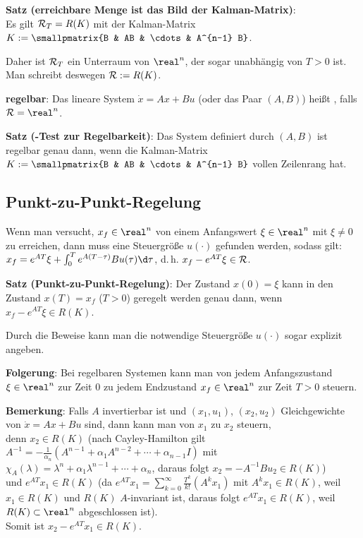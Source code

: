 \linie

\textbf{Satz (erreichbare Menge ist das Bild der Kalman-Matrix)}:\\
Es gilt $\mathcal{R}_T = R(K)$ mit der Kalman-Matrix
$K := \smallpmatrix{B & AB & \cdots & A^{n-1} B}$.

Daher ist $\mathcal{R}_T$ ein Unterraum von $\real^n$, der sogar unabhängig von $T > 0$ ist.
Man schreibt deswegen $\mathcal{R} := R(K)$.

\textbf{regelbar}:
Das lineare System $\dot{x} = Ax + Bu$ (oder das Paar $(A, B)$) heißt
, falls $\R = \real^n$.

\textbf{Satz (-Test zur Regelbarkeit)}:
Das System definiert durch $(A, B)$ ist regelbar genau dann,
wenn die Kalman-Matrix $K := \smallpmatrix{B & AB & \cdots & A^{n-1} B}$ vollen Zeilenrang hat.

\subsection{%
    Punkt-zu-Punkt-Regelung%
}

Wenn man versucht, $x_f \in \real^n$ von einem Anfangswert $\xi \in \real^n$ mit $\xi \not= 0$
zu erreichen, dann muss eine Steuergröße $u(\cdot)$ gefunden werden,
sodass gilt:
$x_f = e^{AT}\xi + \int_0^T e^{A(T-\tau)} Bu(\tau) \d\tau$,
d.\,h. $x_f - e^{AT}\xi \in \mathcal{R}$.

\textbf{Satz (Punkt-zu-Punkt-Regelung)}:
Der Zustand $x(0) = \xi$ kann in den Zustand $x(T) = x_f$ ($T > 0$) geregelt werden genau dann,
wenn $x_f - e^{AT} \xi \in R(K)$.

Durch die Beweise kann man die notwendige Steuergröße $u(\cdot)$ sogar explizit angeben.

\textbf{Folgerung}:
Bei regelbaren Systemen kann man von jedem Anfangszustand $\xi \in \real^n$
zur Zeit $0$ zu jedem Endzustand $x_f \in \real^n$ zur Zeit $T > 0$ steuern.

\textbf{Bemerkung}:
Falls $A$ invertierbar ist und $(x_1, u_1)$, $(x_2, u_2)$ Gleichgewichte von
$\dot{x} = Ax + Bu$ sind, dann kann man von $x_1$ zu $x_2$ steuern,\\
denn $x_2 \in R(K)$
(nach Cayley-Hamilton gilt $A^{-1} = -\frac{1}{\alpha_n} (A^{n-1} + \alpha_1 A^{n-2} + \dotsb +
\alpha_{n-1} I)$ mit $\chi_A(\lambda) = \lambda^n + \alpha_1 \lambda^{n-1} + \dotsb + \alpha_n$,
daraus folgt $x_2 = -A^{-1} Bu_2 \in R(K)$)\\
und $e^{AT} x_1 \in R(K)$
(da $e^{AT} x_1 = \sum_{k=0}^\infty \frac{T^k}{k!} (A^k x_1)$
mit $A^k x_1 \in R(K)$, weil $x_1 \in R(K)$ und $R(K)$ $A$-invariant ist,
daraus folgt $e^{AT} x_1 \in R(K)$, weil $R(K) \subset \real^n$ abgeschlossen ist).\\
Somit ist $x_2 - e^{AT} x_1 \in R(K)$.

